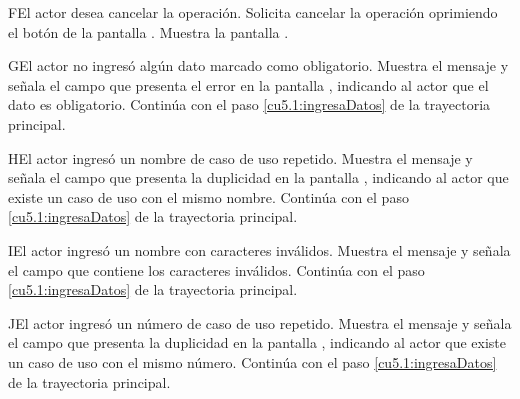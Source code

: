  \begin{UCtrayectoriaA}{F}{El actor desea cancelar la operación.}
    \UCpaso[\UCactor] Solicita cancelar la operación oprimiendo el botón  de la pantalla .
    \UCpaso[\UCsist] Muestra la pantalla .
 \end{UCtrayectoriaA}
 \begin{UCtrayectoriaA}{G}{El actor no ingresó algún dato marcado como obligatorio.}
    \UCpaso[\UCsist] Muestra el mensaje  y señala el campo que presenta el error en la pantalla 
	    , indicando al actor que el dato es obligatorio.
    \UCpaso[] Continúa con el paso \ref{cu5.1:ingresaDatos} de la trayectoria principal.
 \end{UCtrayectoriaA}
 \begin{UCtrayectoriaA}{H}{El actor ingresó un nombre de caso de uso repetido.}
    \UCpaso[\UCsist] Muestra el mensaje  y señala el campo que presenta la duplicidad en la pantalla 
	    , indicando al actor que existe un caso de uso con el mismo nombre.
    \UCpaso[] Continúa con el paso \ref{cu5.1:ingresaDatos} de la trayectoria principal.
 \end{UCtrayectoriaA}
 \begin{UCtrayectoriaA}{I}{El actor ingresó un nombre con caracteres inválidos.}
    \UCpaso[\UCsist] Muestra el mensaje  y señala el campo que contiene los caracteres inválidos.
    \UCpaso[] Continúa con el paso \ref{cu5.1:ingresaDatos} de la trayectoria principal.
 \end{UCtrayectoriaA}
 \begin{UCtrayectoriaA}{J}{El actor ingresó un número de caso de uso repetido.}
    \UCpaso[\UCsist] Muestra el mensaje  y señala el campo que presenta la duplicidad en la pantalla 
	    , indicando al actor que existe un caso de uso con el mismo número.
    \UCpaso[] Continúa con el paso \ref{cu5.1:ingresaDatos} de la trayectoria principal.
 \end{UCtrayectoriaA}
